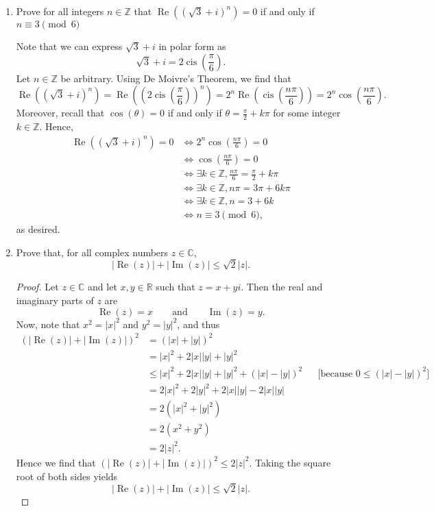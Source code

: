 \documentclass[11pt]{article}
\def\integers{\mathbb{Z}}
\def\reals{\mathbb{R}}
\def\complex{\mathbb{C}}
\begin{document}
\begin{enumerate}
\begin{enumerate}
\end{enumerate}

 \item Prove for all integers $n\in\integers$ that $\operatorname{Re}((\sqrt{3}+i)^{n}) = 0$ if and only if $n\equiv 3 \pmod{6}$
\begin{Solution}
 Note that we can express $\sqrt{3}+i$ in polar form as
 \[
  \sqrt{3}+i = 2\operatorname{cis}\left(\frac{\pi}{6}\right).
 \]
 Let $n\in\integers$ be arbitrary. Using De Moivre's Theorem, we find that
 \[
  \operatorname{Re}((\sqrt{3}+i)^{n}) = \operatorname{Re}\left(\left(2\operatorname{cis}\left(\frac{\pi}{6}\right)\right)^n\right) = 2^n\operatorname{Re}\left(\operatorname{cis}\left(\frac{n\pi}{6}\right)\right) = 2^n\cos\left(\frac{n\pi}{6}\right).
 \]
Moreover, recall that $\cos(\theta)=0$ if and only if $\theta = \frac{\pi}{2} + k\pi$ for some integer $k\in\integers$. Hence,
\begin{align*}
 \operatorname{Re}((\sqrt{3}+i)^{n}) =0
    & \iff 2^n\cos\left(\frac{n\pi}{6}\right) = 0\\
    &\iff \cos\left(\frac{n\pi}{6}\right)=0\\
    &\iff \exists k\in\integers, \frac{n\pi}{6} = \frac{\pi}{2} + k\pi\\
    &\iff\exists k\in\integers, n\pi = 3\pi + 6k\pi\\
    &\iff\exists k\in\integers, n = 3 + 6k\\
    &\iff n\equiv 3\pmod{6},
\end{align*}
as desired.

 \end{Solution}
 
 \item Prove that, for all complex numbers $z\in\complex$, 
 \[
  |\operatorname{Re}(z)| + |\operatorname{Im}(z)| \leq \sqrt{2}|z|.
 \]
\begin{Solution}
 \begin{proof}
  Let $z\in\complex$ and let $x,y\in\reals$ such that $z=x+yi$. Then the real and imaginary parts of $z$ are
  \[
   \operatorname{Re}(z) = x\qquad\text{and}\qquad\operatorname{Im}(z)=y.
  \]
Now, note that $x^2 = |x|^2$ and $y^2=|y|^2$, and thus
\begin{align*}
 \left(|\operatorname{Re}(z)| + |\operatorname{Im}(z)|\right)^2 & = (|x|+|y|)^2\\
  & = |x|^2 + 2|x||y| + |y|^2\\
& \leq |x|^2 + 2|x||y| + |y|^2 + (|x|-|y|)^2 && \text{[because }0\leq (|x|-|y|)^2]\\
&=2|x|^2 + 2|y|^2 + 2|x||y| - 2|x||y|\\
& = 2(|x|^2 + |y|^2) \\
& = 2(x^2+y^2)\\
& = 2|z|^2.
\end{align*}
Hence we find that $\left(|\operatorname{Re}(z)| + |\operatorname{Im}(z)|\right)^2\leq 2|z|^2$. Taking the square root of both sides yields
\[
|\operatorname{Re}(z)| + |\operatorname{Im}(z)| \leq \sqrt{2}|z|.
\]


\end{proof}
\end{Solution}
\end{enumerate}
\end{document}
